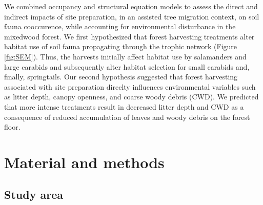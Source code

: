 We combined occupancy and structural equation models to assess the direct and indirect impacts of site preparation, in an assisted tree migration context, 
on soil fauna cooccurence, while accounting for environmental disturbance in the mixedwood forest.
We first hypothesized that forest harvesting treatments alter habitat use of soil fauna propagating through the trophic network (Figure \ref*{fig:SEM}). 
Thus, the harvests initially affect habitat use by salamanders and large carabids and subsequently alter habitat selection for small carabids and, finally, springtails.
Our second hypothesis suggested that forest harvesting associated with site preparation direclty influences environmental variables such as litter depth, canopy openness, and coarse woody debris (CWD). 
We predicted that more intense treatments result in decreased litter depth and CWD as a consequence of reduced accumulation of leaves and woody debris on the forest floor.

\section*{Material and methods}
\label{sec:matmet1}

\subsection*{Study area}
\label{subsec:area}

